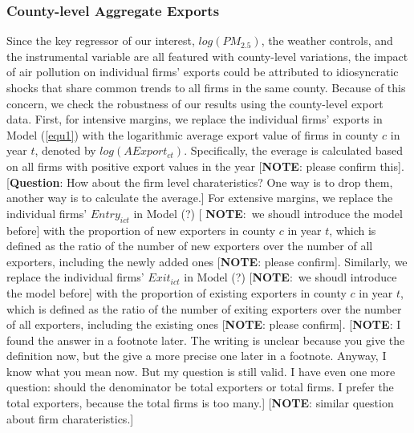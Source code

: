 \documentclass[12pt]{article}
\begin{document}
\subsubsection{County-level Aggregate Exports}

Since the key regressor of our interest, $log(PM_{2.5})$, the weather
controls, and the instrumental variable are all featured with county-level
variations, the impact of air pollution on individual firms' exports could
be attributed to idiosyncratic shocks that share common trends to all firms
in the same county. Because of this concern, we check the robustness of our
results using the county-level export data. First, for intensive margins, we
replace the individual firms' exports in Model (\ref{equ1}) with the
logarithmic average export value of firms in county $c$ in year $t$, denoted
by $log(AExport_{ct})$. Specifically, the everage is calculated based on all
firms with positive export values in the year [\textbf{NOTE}: please confirm
this]. [\textbf{Question}: How about the firm level charateristics? One way
is to drop them, another way is to calculate the average.] For extensive
margins, we replace the individual firms' $Entry_{ict}$ in Model (?) [%
\textbf{NOTE}:\ we shoudl introduce the model before] with the proportion of
new exporters in county $c$ in year $t$, which is defined as the ratio of
the number of new exporters over the number of all exporters, including the
newly added ones [\textbf{NOTE}: please confirm]. Similarly, we replace the
individual firms' $Exit_{ict}$ in Model (?) [\textbf{NOTE}:\ we shoudl
introduce the model before] with the proportion of existing exporters in
county $c$ in year $t$, which is defined as the ratio of the number of
exiting exporters over the number of all exporters, including the existing
ones [\textbf{NOTE}: please confirm]. [\textbf{NOTE}: I found the answer in
a footnote later. The writing is unclear because you give the definition
now, but the give a more precise one later in a footnote. Anyway, I know
what you mean now. But my question is still valid. I have even one more
question: should the denominator be total exporters or total firms. I prefer
the total exporters, because the total firms is too many.] [\textbf{NOTE}:
similar question about firm charateristics.]
\end{document}

